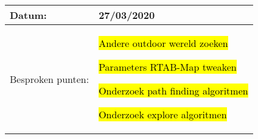 \begin{tabularx}{\textwidth}{| l | X |}
  \hline
  Datum: & 27/03/2020\\
  \hline
  Besproken punten: &
  \begin{compactitem}
    \item \hl{Andere outdoor wereld zoeken}
    \item \hl{Parameters RTAB-Map tweaken}
    \item \hl{Onderzoek path finding algoritmen}
    \item \hl{Onderzoek explore algoritmen}
  \end{compactitem}\\
  \hline
\end{tabularx}